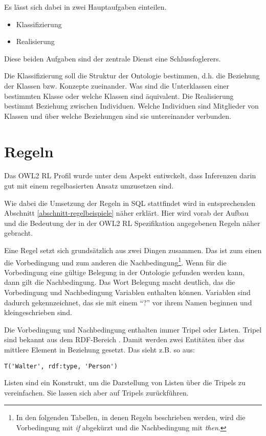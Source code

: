Es lässt sich dabei in zwei Hauptaufgaben einteilen.
\begin{itemize}
  \item Klassifizierung
  \item Realisierung
\end{itemize}
Diese beiden Aufgaben sind der zentrale Dienst eine Schlussfoglerers. 

Die Klassifizierung soll die Struktur der Ontologie bestimmen, d.h. die Beziehung der Klassen bzw. Konzepte zueinander. Was sind die Unterklassen einer bestimmten Klasse oder welche Klassen sind äquivalent.
Die Realisierung bestimmt Beziehung zwischen Individuen. Welche Individuen sind Mitglieder von Klassen und über welche Beziehungen sind sie untereinander verbunden.

\section{Regeln}
Das OWL2 RL Profil wurde unter dem Aspekt entiwckelt, dass Inferenzen darin gut mit einem regelbasierten Ansatz umzusetzen sind.

Wie dabei die Umsetzung der Regeln in SQL stattfindet wird in entsprechenden Abschnitt \ref{abschnitt-regelbeispiele} näher erklärt. Hier wird vorab der Aufbau und die Bedeutung der in der OWL2 RL Spezifikation angegebenen Regeln näher gebracht.

Eine Regel setzt sich grundsätzlich aus zwei Dingen zusammen. Das ist zum einen die Vorbedingung und zum anderen die Nachbedingung\footnote{In den folgenden Tabellen, in denen Regeln beschrieben werden, wird die Vorbedingung mit \emph{if} abgekürzt und die Nachbedingung mit \emph{then}.}. Wenn für die Vorbedingung eine gültige Belegung in der Ontologie gefunden werden kann, dann gilt die Nachbedingung. Das Wort Belegung macht deutlich, das die Vorbedingung und Nachbedingung Variablen enthalten können. Variablen sind dadurch gekennzeichnet, das sie mit einem ``?'' vor ihrem Namen beginnen und kleingeschrieben sind.

Die Vorbedingung und Nachbedingung enthalten immer Tripel oder Listen. Tripel sind bekannt aus dem RDF-Bereich \cite{RDF2004}. Damit werden zwei Entitäten über das mittlere Element in Beziehung gesetzt. Das sieht z.B. so aus:
\begin{verbatim}
T('Walter', rdf:type, 'Person')
\end{verbatim}
Listen sind ein Konstrukt, um die Darstellung von Listen über die Tripels zu vereinfachen. Sie lassen sich aber auf Tripels zurückführen.

